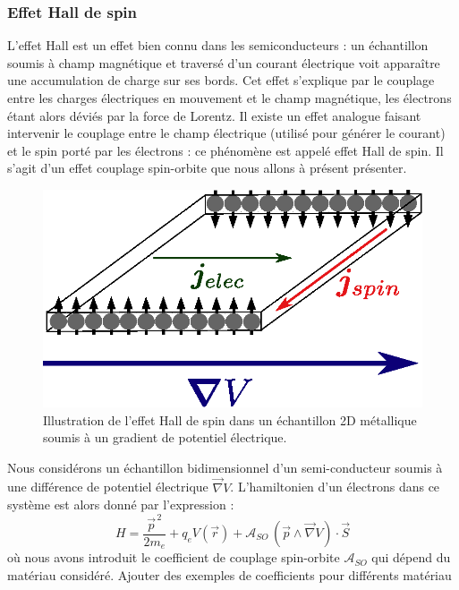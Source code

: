 \documentclass[a4paper,11pt]{article} %
\begin{document}
	
	
	\subsubsection{Effet Hall de spin}
	L'effet Hall est un effet bien connu dans les semiconducteurs : un échantillon soumis à champ magnétique et traversé d'un courant électrique voit apparaître une accumulation de charge sur ses bords. Cet effet s'explique par le couplage entre les charges électriques en mouvement et le champ magnétique, les électrons étant alors déviés par la force de Lorentz. Il existe un effet analogue faisant intervenir le couplage entre le champ électrique (utilisé pour générer le courant) et le spin porté par les électrons : ce phénomène est appelé effet Hall de spin. Il s'agit d'un effet couplage spin-orbite que nous allons à présent présenter. 
	
	\begin{figure}[h]
		\centering
		\begin{minipage}[c]{0.85\linewidth}
			\centering
			\includegraphics[width=0.5\linewidth]{./Illustrations/SHE_electrons.eps}
			\caption{Illustration de l'effet Hall de spin dans un échantillon 2D métallique soumis à un gradient de potentiel électrique.}
			\label{fig:spin-Hall-effect}
		\end{minipage}
	\end{figure}
	
	Nous considérons un échantillon bidimensionnel d'un semi-conducteur soumis à une différence de potentiel électrique $\vec{\nabla} V$. L'hamiltonien d'un électrons dans ce système est alors donné par l'expression :
	\begin{equation*}
		\label{exp_hamiltonien_SHE}
		H = \frac{\vec{p}^{\, 2}}{2m_e} + q_e V(\vec{r}) + \mathcal{A}_{SO} \, (\vec{p} \wedge \! \vec{\nabla} V) \cdot \vec{S}
	\end{equation*}
	où nous avons introduit le coefficient de couplage spin-orbite $ \mathcal{A}_{SO} $ qui dépend du matériau considéré. {\color{gray} Ajouter des exemples de coefficients pour différents matériau}\\ %
	
\end{document}
